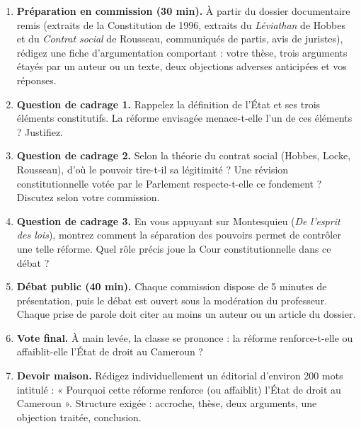 \documentclass[11pt]{article}
\newcounter{popsec}
\newcounter{popsub}
\newcommand{\courssub}[1]{%
  \stepcounter{popsub}%
  \par\vspace{9pt}\noindent{\popxbold\fontsize{11.5}{13}\selectfont\color{popink}{\color{poporange}\thepopsec.\thepopsub}\hspace{6pt}#1}\par\nopagebreak\vspace{4pt}
}
\begin{document}
\begin{enumerate}
\item \textbf{Préparation en commission (30 min).} À partir du dossier documentaire remis (extraits de la Constitution de 1996, extraits du \emph{Léviathan} de Hobbes et du \emph{Contrat social} de Rousseau, communiqués de partis, avis de juristes), rédigez une fiche d'argumentation comportant : votre thèse, trois arguments étayés par un auteur ou un texte, deux objections adverses anticipées et vos réponses.
\item \textbf{Question de cadrage 1.} Rappelez la définition de l'État et ses trois éléments constitutifs. La réforme envisagée menace-t-elle l'un de ces éléments ? Justifiez.
\item \textbf{Question de cadrage 2.} Selon la théorie du contrat social (Hobbes, Locke, Rousseau), d'où le pouvoir tire-t-il sa légitimité ? Une révision constitutionnelle votée par le Parlement respecte-t-elle ce fondement ? Discutez selon votre commission.
\item \textbf{Question de cadrage 3.} En vous appuyant sur Montesquieu (\emph{De l'esprit des lois}), montrez comment la séparation des pouvoirs permet de contrôler une telle réforme. Quel rôle précis joue la Cour constitutionnelle dans ce débat ?
\item \textbf{Débat public (40 min).} Chaque commission dispose de 5 minutes de présentation, puis le débat est ouvert sous la modération du professeur. Chaque prise de parole doit citer au moins un auteur ou un article du dossier.
\item \textbf{Vote final.} À main levée, la classe se prononce : la réforme renforce-t-elle ou affaiblit-elle l'État de droit au Cameroun ?
\item \textbf{Devoir maison.} Rédigez individuellement un éditorial d'environ \num{200} mots intitulé : « Pourquoi cette réforme renforce (ou affaiblit) l'État de droit au Cameroun ». Structure exigée : accroche, thèse, deux arguments, une objection traitée, conclusion.
\end{enumerate}

\courssub{Ressources à mobiliser}
\end{document}

